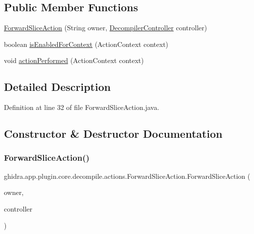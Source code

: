 \subsection*{Public Member Functions}
\begin{DoxyCompactItemize}
\item 
\mbox{\hyperlink{classghidra_1_1app_1_1plugin_1_1core_1_1decompile_1_1actions_1_1_forward_slice_action_a7701ec56e08d790e13d27099be4ff9f7}{Forward\+Slice\+Action}} (String owner, \mbox{\hyperlink{classghidra_1_1app_1_1decompiler_1_1component_1_1_decompiler_controller}{Decompiler\+Controller}} controller)
\item 
boolean \mbox{\hyperlink{classghidra_1_1app_1_1plugin_1_1core_1_1decompile_1_1actions_1_1_forward_slice_action_a345e16519a57665243a9d06325725da2}{is\+Enabled\+For\+Context}} (Action\+Context context)
\item 
void \mbox{\hyperlink{classghidra_1_1app_1_1plugin_1_1core_1_1decompile_1_1actions_1_1_forward_slice_action_ab3b7dd45d886adf2d699ed7ad2a190eb}{action\+Performed}} (Action\+Context context)
\end{DoxyCompactItemize}


\subsection{Detailed Description}


Definition at line 32 of file Forward\+Slice\+Action.\+java.



\subsection{Constructor \& Destructor Documentation}
\mbox{\label{classghidra_1_1app_1_1plugin_1_1core_1_1decompile_1_1actions_1_1_forward_slice_action_a7701ec56e08d790e13d27099be4ff9f7}} 
\subsubsection{\texorpdfstring{ForwardSliceAction()}{ForwardSliceAction()}}
{\footnotesize\ttfamily ghidra.\+app.\+plugin.\+core.\+decompile.\+actions.\+Forward\+Slice\+Action.\+Forward\+Slice\+Action (\begin{DoxyParamCaption}\item[{String}]{owner,  }\item[{\mbox{\hyperlink{classghidra_1_1app_1_1decompiler_1_1component_1_1_decompiler_controller}{Decompiler\+Controller}}}]{controller }\end{DoxyParamCaption})\hspace{0.3cm}{\ttfamily [inline]}}



